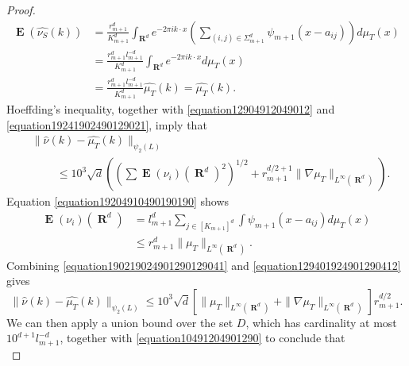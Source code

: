 \documentclass[12pt,reqno]{article}
\numberwithin{equation}{section}
\DeclareMathOperator{\RR}{\mathbf{R}}
\DeclareMathOperator{\EE}{\mathbf{E}}
\newcommand{\psitwo}[1]{\| {#1} \|_{\psi_2(L)}}
\begin{document}
\begin{proof}
    \begin{equation} \label{equation19241902490129021}
    \begin{split}
        \EE(\widehat{\nu_S}(k)) &= \frac{r_{m+1}^d}{K_{m+1}^d} \int_{\RR^d} e^{-2 \pi i k \cdot x} \left( \sum_{(i,j) \in \Sigma_{m+1}^d} \psi_{m+1}(x - a_{ij}) \right) d\mu_T(x)\\
        &= \frac{r_{m+1}^d l_{m+1}^{-d}}{K_{m+1}^d} \int_{\RR^d} e^{-2 \pi i k \cdot x} d\mu_T(x)\\
        &= \frac{r_{m+1}^d l_{m+1}^{-d}}{K_{m+1}^d} \widehat{\mu_T}(k) = \widehat{\mu_T}(k).
    \end{split}
    \end{equation}
    Hoeffding's inequality, together with \eqref{equation12904912049012} and \eqref{equation19241902490129021}, imply that
    \begin{equation} \label{equation190219024901290129041}
    \begin{split}
        & \psitwo{\widehat{\nu}(k) - \widehat{\mu_T}(k)}\\
        &\ \ \ \ \ \ \ \ \ \ \leq 10^3 \sqrt{d} \left( \left( \sum \EE(\nu_i)(\RR^d)^2 \right)^{1/2} + r_{m+1}^{d/2+1} \| \nabla \mu_T \|_{L^\infty(\RR^d)} \right).
    \end{split}
    \end{equation}
    Equation \eqref{equation19204910490190190} shows
    \begin{equation} \label{equation129401924901290412}
    \begin{split}
        \EE(\nu_i)(\RR^d) &= l_{m+1}^d \sum_{j \in [K_{m+1}]^d} \int \psi_{m+1}(x - a_{ij}) d\mu_T(x)\\
        &\leq r_{m+1}^d \| \mu_T \|_{L^\infty(\RR^d)}.
    \end{split}
    \end{equation}
    Combining \eqref{equation190219024901290129041} and \eqref{equation129401924901290412} gives
    \begin{equation} \label{equation10491204901290}
        \psitwo{\widehat{\nu}(k) - \widehat{\mu_T}(k)} \leq 10^3 \sqrt{d} \left[ \| \mu_T \|_{L^\infty(\RR^d)} + \| \nabla \mu_T \|_{L^\infty(\RR^d)} \right] r_{m+1}^{d/2}.
    \end{equation}
    We can then apply a union bound over the set $D$, which has cardinality at most $10^{d+1} l_{m+1}^{-d}$, together with \eqref{equation10491204901290} to conclude that
    \begin{equation} \label{equation1290421941021290}

\end{equation}
\end{proof}
\end{document}
